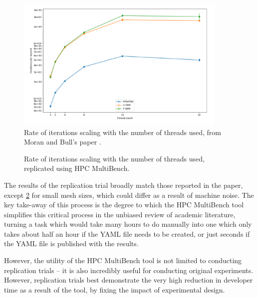 \begin{figure}[H]
    \centering
    \includegraphics[width=0.9\textwidth]{images/4_tooling/replication_study/replication_original_4.png}
    \caption{Rate of iterations scaling with the number of threads used, from Moran and Bull's paper \cite{moranEmergingTechnologiesRust2023}.}
    \label{fig:replication_original_4}
\end{figure}
\begin{figure}[H]
    \centering
    
    \vspace*{-0.5cm}
    \caption{Rate of iterations scaling with the number of threads used, replicated using HPC MultiBench.}
    \label{fig:replication_mine_4}
\end{figure}


The results of the replication trial broadly match those reported in the paper, except \ref{fig:replication_mine_4} for small mesh sizes, which could differ as a result of machine noise. The key take-away of this process is the degree to which the HPC MultiBench tool simplifies this critical process in the unbiased review of academic literature, turning a task which would take many hours to do manually into one which only takes about half an hour if the YAML file needs to be created, or just seconds if the YAML file is published with the results.

However, the utility of the HPC MultiBench tool is not limited to conducting replication trials -- it is also incredibly useful for conducting original experiments. However, replication trials best demonstrate the very high reduction in developer time as a result of the tool, by fixing the impact of experimental design.


